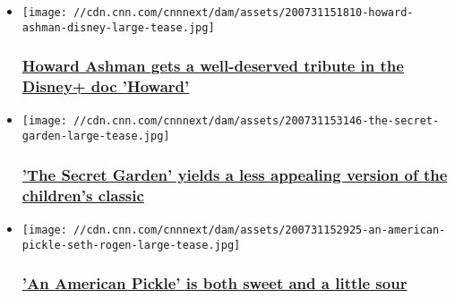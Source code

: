 \begin{itemize}
\item
  \href{/2020/08/07/entertainment/howard-review-disney/index.html}{}

  \texttt{[image: //cdn.cnn.com/cnnnext/dam/assets/200731151810-howard-ashman-disney-large-tease.jpg]}

  \hypertarget{howard-ashman-gets-a-well-deserved-tribute-in-the-disney-doc-howard}{%
  \subsubsection{\texorpdfstring{\href{/2020/08/07/entertainment/howard-review-disney/index.html}{Howard
  Ashman gets a well-deserved tribute in the Disney+ doc
  'Howard'}}{Howard Ashman gets a well-deserved tribute in the Disney+ doc 'Howard'}}\label{howard-ashman-gets-a-well-deserved-tribute-in-the-disney-doc-howard}}
\item
  \href{/2020/08/07/entertainment/the-secret-garden-review/index.html}{}

  \texttt{[image: //cdn.cnn.com/cnnnext/dam/assets/200731153146-the-secret-garden-large-tease.jpg]}

  \hypertarget{the-secret-garden-yields-a-less-appealing-version-of-the-childrens-classic}{%
  \subsubsection{\texorpdfstring{\href{/2020/08/07/entertainment/the-secret-garden-review/index.html}{'The
  Secret Garden' yields a less appealing version of the children's
  classic}}{'The Secret Garden' yields a less appealing version of the children's classic}}\label{the-secret-garden-yields-a-less-appealing-version-of-the-childrens-classic}}
\item
  \href{/2020/08/06/entertainment/an-american-pickle-review/index.html}{}

  \texttt{[image: //cdn.cnn.com/cnnnext/dam/assets/200731152925-an-american-pickle-seth-rogen-large-tease.jpg]}

  \hypertarget{an-american-pickle-is-both-sweet-and-a-little-sour}{%
  \subsubsection{\texorpdfstring{\href{/2020/08/06/entertainment/an-american-pickle-review/index.html}{'An
  American Pickle' is both sweet and a little
  sour}}{'An American Pickle' is both sweet and a little sour}}\label{an-american-pickle-is-both-sweet-and-a-little-sour}}
\end{itemize}

